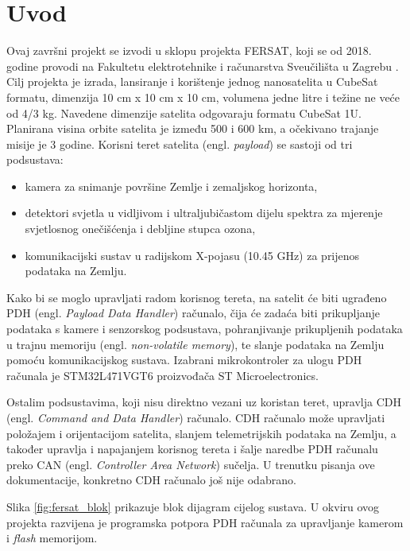 \chapter{Uvod}

Ovaj završni projekt se izvodi u sklopu projekta FERSAT, koji se od 2018. godine provodi na Fakultetu elektrotehnike i računarstva Sveučilišta u Zagrebu \cite{fersat_stranica_projekta}. Cilj projekta je izrada, lansiranje i korištenje jednog nanosatelita u CubeSat formatu, dimenzija 10 cm x 10 cm x 10 cm, volumena jedne litre i težine ne veće od 4/3 kg. Navedene dimenzije satelita odgovaraju formatu CubeSat 1U. Planirana visina orbite satelita je između 500 i 600 km, a očekivano trajanje misije je 3 godine. Korisni teret satelita (engl. \textit{payload}) se sastoji od tri podsustava:

\begin{itemize}
	\item kamera za snimanje površine Zemlje i zemaljskog horizonta,
	\item detektori svjetla u vidljivom i ultraljubičastom dijelu spektra za mjerenje svjetlosnog onečišćenja i debljine stupca ozona,
	\item komunikacijski sustav u radijskom X-pojasu (10.45 GHz) za prijenos podataka na Zemlju.
\end{itemize}

Kako bi se moglo upravljati radom korisnog tereta, na satelit će biti ugrađeno PDH (engl. \textit{Payload Data Handler}) računalo, čija će zadaća biti prikupljanje podataka s kamere i senzorskog podsustava, pohranjivanje prikupljenih podataka u trajnu memoriju (engl. \textit{non-volatile memory}), te slanje podataka na Zemlju pomoću komunikacijskog sustava. Izabrani mikrokontroler za ulogu PDH računala je STM32L471VGT6 proizvođača ST Microelectronics.

Ostalim podsustavima, koji nisu direktno vezani uz koristan teret, upravlja CDH (engl. \textit{Command and Data Handler}) računalo. CDH računalo može upravljati položajem i orijentacijom satelita, slanjem telemetrijskih podataka na Zemlju, a također upravlja i napajanjem korisnog tereta i šalje naredbe PDH računalu preko CAN (engl. \textit{Controller Area Network}) sučelja. U trenutku pisanja ove dokumentacije, konkretno CDH računalo još nije odabrano.
    
Slika \ref{fig:fersat_blok} prikazuje blok dijagram cijelog sustava. U okviru ovog projekta razvijena je programska potpora PDH računala za upravljanje kamerom i \textit{flash} memorijom.

